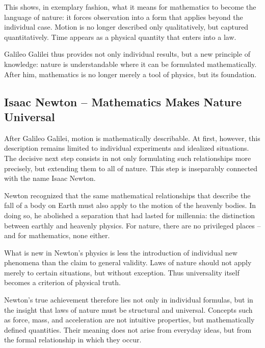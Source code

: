 This shows, in exemplary fashion,
what it means for mathematics to become the language of nature:
it forces observation into a form
that applies beyond the individual case.
Motion is no longer described only qualitatively,
but captured quantitatively.
Time appears as a physical quantity
that enters into a law.

Galileo Galilei thus provides not only individual results,
but a new principle of knowledge:
nature is understandable where it can be formulated mathematically.
After him, mathematics
is no longer merely a tool of physics,
but its foundation.

\subsection{Isaac Newton -- Mathematics Makes Nature Universal}

After Galileo Galilei, motion is mathematically describable.
At first, however, this description remains limited
to individual experiments and idealized situations.
The decisive next step consists in not only formulating
such relationships more precisely,
but extending them to all of nature.
This step is inseparably connected with the name
Isaac Newton.

Newton recognized
that the same mathematical relationships
that describe the fall of a body on Earth
must also apply to the motion of the heavenly bodies.
In doing so, he abolished a separation
that had lasted for millennia:
the distinction between earthly and heavenly physics.
For nature, there are no privileged places --
and for mathematics, none either.

\begin{HistoryBox}
	\label{box:laws}
	What is new in Newton's physics is less the introduction of individual new phenomena
	than the claim to general validity.
	Laws of nature should not apply merely to certain situations,
	but without exception.
	Thus universality
	itself becomes a criterion of physical truth.
\end{HistoryBox}

Newton's true achievement therefore lies not only in individual formulas,
but in the insight
that laws of nature must be structural and universal.
Concepts such as force, mass,
and acceleration
are not intuitive properties,
but mathematically defined quantities.
Their meaning does not arise from everyday ideas,
but from the formal relationship
in which they occur.

